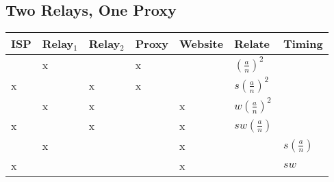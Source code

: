 
\subsection{Two Relays, One Proxy}


\begin{center}
\begin{tabular}{l | l | l | l | l | l | l}
  ISP & Relay$_1$ & Relay$_2$ & Proxy & Website & Relate             & Timing \\
  \hline
      & x         &           & x     &         & $(\frac{a}{n})^2$  & \\
  \hline
  x   &           & x         & x     &         & $s(\frac{a}{n})^2$ & \\
  \hline
      & x         & x         &       & x       & $w(\frac{a}{n})^2$ & \\
  \hline
  x   &           & x         &       & x       & $sw(\frac{a}{n})$  & \\
  \hline
      & x         &           &       & x       &                    & $s(\frac{a}{n})$ \\
  \hline
  x   &           &           &       & x       &                    & $sw$ \\
\end{tabular}
\end{center}



